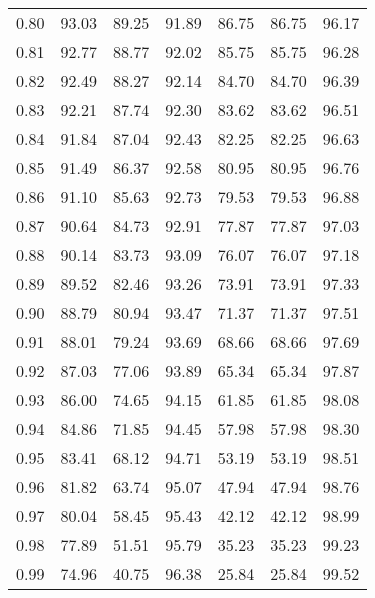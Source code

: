 \begin{tabular}{|c|c|c|c|c|c|c|}
      0.80 &     93.03 &     89.25 &      91.89 &   86.75 &      86.75 &         96.17 \\
      0.81 &     92.77 &     88.77 &      92.02 &   85.75 &      85.75 &         96.28 \\
      0.82 &     92.49 &     88.27 &      92.14 &   84.70 &      84.70 &         96.39 \\
      0.83 &     92.21 &     87.74 &      92.30 &   83.62 &      83.62 &         96.51 \\
      0.84 &     91.84 &     87.04 &      92.43 &   82.25 &      82.25 &         96.63 \\
      0.85 &     91.49 &     86.37 &      92.58 &   80.95 &      80.95 &         96.76 \\
      0.86 &     91.10 &     85.63 &      92.73 &   79.53 &      79.53 &         96.88 \\
      0.87 &     90.64 &     84.73 &      92.91 &   77.87 &      77.87 &         97.03 \\
      0.88 &     90.14 &     83.73 &      93.09 &   76.07 &      76.07 &         97.18 \\
      0.89 &     89.52 &     82.46 &      93.26 &   73.91 &      73.91 &         97.33 \\
      0.90 &     88.79 &     80.94 &      93.47 &   71.37 &      71.37 &         97.51 \\
      0.91 &     88.01 &     79.24 &      93.69 &   68.66 &      68.66 &         97.69 \\
      0.92 &     87.03 &     77.06 &      93.89 &   65.34 &      65.34 &         97.87 \\
      0.93 &     86.00 &     74.65 &      94.15 &   61.85 &      61.85 &         98.08 \\
      0.94 &     84.86 &     71.85 &      94.45 &   57.98 &      57.98 &         98.30 \\
      0.95 &     83.41 &     68.12 &      94.71 &   53.19 &      53.19 &         98.51 \\
      0.96 &     81.82 &     63.74 &      95.07 &   47.94 &      47.94 &         98.76 \\
      0.97 &     80.04 &     58.45 &      95.43 &   42.12 &      42.12 &         98.99 \\
      0.98 &     77.89 &     51.51 &      95.79 &   35.23 &      35.23 &         99.23 \\
      0.99 &     74.96 &     40.75 &      96.38 &   25.84 &      25.84 &         99.52 \\
\bottomrule
\end{tabular}
